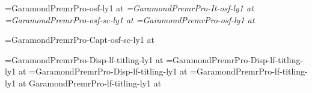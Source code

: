 %
%


\def\romantext{GaramondPremrPro-osf-ly1 }
\def\italictext{GaramondPremrPro-It-osf-ly1 }
\def\smallcaptext{GaramondPremrPro-osf-sc-ly1 }
\def\titlingtext{GaramondPremrPro-lf-titling-ly1 }
\def\smallcapcaption{GaramondPremrPro-Capt-osf-sc-ly1 }
\def\titlingdisplay{GaramondPremrPro-Disp-lf-titling-ly1 }
\def\proximatitling{ProximaNova-Regular-lf-titling-ly1 }

\newdimen\textsize \textsize=11pt
\newdimen\smalltextsize \smalltextsize=10pt
\newdimen\headlinesize \headlinesize=8pt
\newdimen\booktitlesize \booktitlesize=30pt
\newdimen\authornamesize \authornamesize=24pt
\newdimen\publishernamesize \publishernamesize=24pt
\newdimen\aheadsize \aheadsize=24pt
\newdimen\bheadsize \bheadsize=14pt

\font\rm=\romantext at \textsize
\font\it=\italictext at \textsize
\font\sc=\smallcaptext at \textsize
\font\fineprint=\romantext at \smalltextsize

\font\headlinefont=\smallcapcaption at \headlinesize

\font\booktitlefont=\titlingdisplay at \booktitlesize
\font\authornamefont=\titlingdisplay at \authornamesize
\font\chaptertitlefont=\titlingdisplay at \aheadsize
\font\scenetitlefont=\titlingtext at \bheadsize
\font\authorinfotitlefont \titlingtext at \smalltextsize

\def\footlinefont{\headlinefont}
\def\bookinfotitlefont{\scenetitlefont}



\newdimen\leading \leading=15pt
